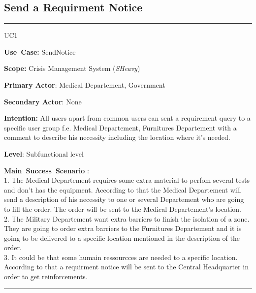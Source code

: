 \subsection{Send a Requirment Notice}
\vspace{0.5cm}
\hrule
\vspace{0.5cm}
\begin{lyxlist}{UC1}
\small{
\item [\textbf{Use~Case:}] SendNotice
\item [\textbf{Scope:}] Crisis Management System (\emph{SHeavy})
\item [\textbf{Primary Actor}:] Medical Departement, Government
\item [\textbf{Secondary Actor}:] None
\item [\textbf{Intention:}] All users apart from common users can sent a
requirement query to a specific user group f.e. Medical Departement, Furnitures Departement with a comment to
describe his necessity including the location where it's needed.
\item [\textbf{Level}:]Subfunctional level
\item [\textbf{Main~Success~Scenario}]:\\
1. The Medical Departement requires some extra material to perfom several tests
and don't has the equipment. According to that the Medical Departement will send
a description of his necessity to one or several Departement who are going to
fill the order. The order will be sent to the Medical Departement's location.\\
2. The Military Departement want extra barriers to finish the isolation of a
zone. They are going to order extra barriers to the Furnitures Departement and
it is going to be delivered to a specific location mentioned in the description
of the order.\\ 
3. It could be that some humain ressourcces are needed to a specific location.
According to that a requirment notice will be sent to the Central Headquarter in
order to get reinforcements.\\
}
\end{lyxlist}
\hrule 
\vspace{0.5cm} 


